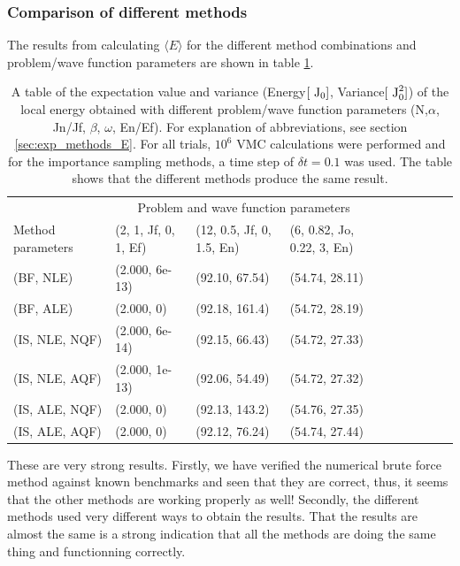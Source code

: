 \subsubsection{Comparison of different methods}\label{sec:res_methods_E}

The results from calculating $\langle E \rangle$ for the different method combinations and problem/wave function parameters are shown in table \ref{tab:methods_E}.

\begin{table}[h!]
	\centering
	\begin{tabular}{l @{ } l @{ } l @{ } l @{ } l @{ } l @{ } l  @{ } l  @{ } l  @{ } l }
	\toprule
	  & \multicolumn{3}{c}{Problem and wave function parameters} \\
	 Method parameters $~~~~$ & (2, 1, Jf, 0, 1, Ef) $~$ & (12, 0.5, Jf, 0, 1.5, En) $~$ & (6, 0.82, Jo, 0.22, 3, En)  \\
	\midrule
	(BF, NLE) & 				(2.000, 6e-13)		&		(92.10, 67.54)		&		(54.74, 28.11)			\\
	\shaderow (BF, ALE)	 &		(2.000, 0)			&		(92.18, 161.4)		&		(54.72, 28.19)		\\
	(IS, NLE, NQF) & 			(2.000, 6e-14)		&		(92.15, 66.43)		&		(54.72, 27.33)				 \\
	\shaderow(IS, NLE, AQF) &	(2.000, 1e-13) 		&		(92.06, 54.49)		&		(54.72, 27.32)						\\
	(IS, ALE, NQF) &			(2.000, 0)			&		(92.13, 143.2)		&		(54.76, 27.35)					\\
	\shaderow (IS, ALE, AQF) &	(2.000, 0) 			&		(92.12, 76.24)		&		(54.74, 27.44)	 				\\
	\bottomrule
	\end{tabular}
	\caption{A table of the expectation value and variance (Energy$[~\textrm{J}_0]$, Variance$[~\textrm{J}_0^2]$) of the local energy obtained with different problem/wave function parameters (N,$\alpha$, Jn/Jf, $\beta$, $\omega$, En/Ef). For explanation of abbreviations, see section \ref{sec:exp_methods_E}.
	For all trials, $10^6$ VMC calculations were performed and for the importance sampling methods, a time step of $\delta t = 0.1$ was used.
	The table shows that the different methods produce the same result.}
	\label{tab:methods_E}
\end{table}

These are very strong results. 
Firstly, we have verified the numerical brute force method against known benchmarks and seen that they are correct,
thus, it seems that the other methods are working properly as well!
Secondly, the different methods used very different ways to obtain the results. 
That the results are almost the same is a strong indication that all the methods are doing the same thing and functionning correctly. 
















